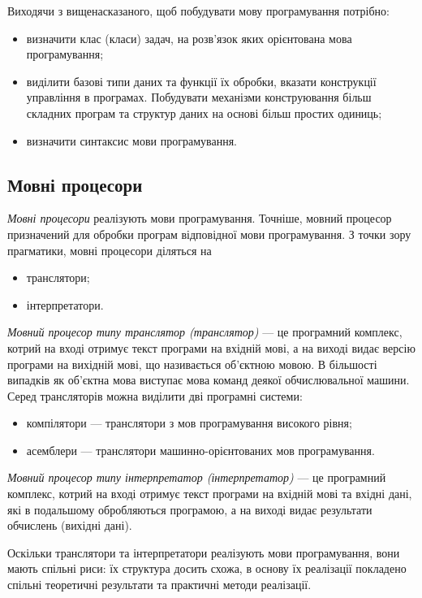 Виходячи з вищенасказаного, щоб побудувати мову програмування потрібно:
\begin{itemize}
	\item визначити клас (класи) задач, на розв'язок яких орієнтована мова програмування;
	\item виділити базові типи даних та функції їх обробки, вказати конструкції 	управління в програмах. Побудувати механізми конструювання більш складних програм та структур даних на основі більш простих одиниць;
	\item визначити синтаксис мови програмування.
\end{itemize}

\subsection{Мовні процесори}

\textit{Мовні процесори} реалізують мови програмування. Точніше, мовний процесор призначений для обробки програм відповідної мови програмування. З точки зору прагматики, мовні процесори діляться на
\begin{itemize}
	\item транслятори;
	\item інтерпретатори.
\end{itemize}

\textit{Мовний процесор типу транслятор (транслятор)} --- це програмний комплекс, котрий на вході отримує текст програми на вхідній мові, а на виході видає версію програми на вихідній мові, що називається об'єктною мовою. В більшості випадків як об'єктна мова виступає мова команд деякої обчислювальної машини. Серед трансляторів можна виділити дві програмні системи:
\begin{itemize}
	\item компілятори --- транслятори з мов програмування високого рівня;
	\item асемблери --- транслятори машинно-орієнтованих мов програмування.
\end{itemize}

\textit{Мовний процесор типу інтерпретатор (інтерпретатор)} --- це програмний комплекс, котрий на вході отримує текст програми на вхідній мові та вхідні дані, які в подальшому обробляються програмою, а на виході видає результати обчислень (вихідні дані). \medskip

Оскільки транслятори та інтерпретатори реалізують мови програмування, вони мають спільні риси: їх структура досить схожа, в основу їх реалізації покладено спільні теоретичні результати та практичні методи реалізації.

